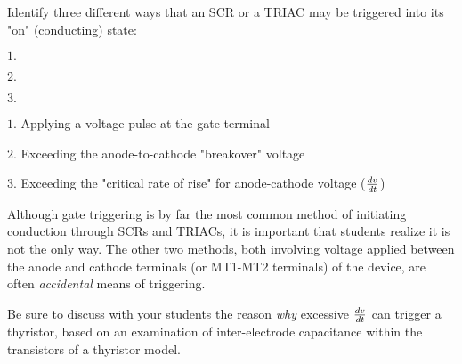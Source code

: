 

Identify three different ways that an SCR or a TRIAC may be triggered into its "on" (conducting) state:

\medskip
\goodbreak
\item{$1.$} 
\item{$2.$} 
\item{$3.$} 
\medskip







\medskip
\goodbreak
\item{$1.$} Applying a voltage pulse at the gate terminal
\item{$2.$} Exceeding the anode-to-cathode "breakover" voltage
\item{$3.$} Exceeding the "critical rate of rise" for anode-cathode voltage ($dv \over dt$)
\medskip







Although gate triggering is by far the most common method of initiating conduction through SCRs and TRIACs, it is important that students realize it is not the only way.  The other two methods, both involving voltage applied between the anode and cathode terminals (or MT1-MT2 terminals) of the device, are often {\it accidental} means of triggering.

Be sure to discuss with your students the reason {\it why} excessive ${dv \over dt}$ can trigger a thyristor, based on an examination of inter-electrode capacitance within the transistors of a thyristor model.




